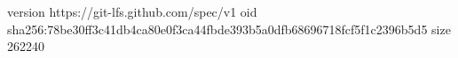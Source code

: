 version https://git-lfs.github.com/spec/v1
oid sha256:78be30ff3c41db4ca80e0f3ca44fbde393b5a0dfb68696718fcf5f1c2396b5d5
size 262240
